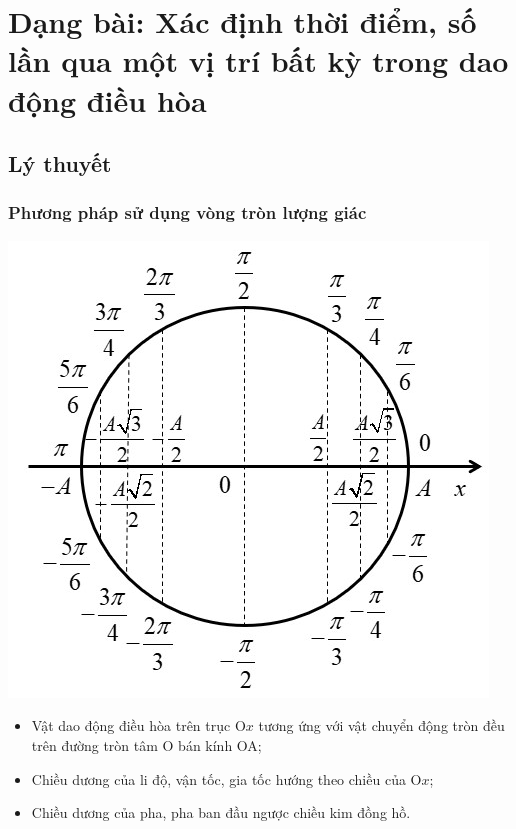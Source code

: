 
\chapter[Dạng bài: Xác định thời điểm, số lần qua một vị trí bất kỳ trong dao động điều hòa]{Dạng bài: Xác định thời điểm, số lần qua một vị trí bất kỳ trong dao động điều hòa}
\section{Lý thuyết}
\subsection{Phương pháp sử dụng vòng tròn lượng giác}
\begin{center}
	\includegraphics[scale=0.7]{../figs/VN12-PH-02-A-001-1-V2-4.jpg}
\end{center}
\begin{itemize}
	\item Vật dao động điều hòa trên trục O$x$ tương ứng với vật chuyển động tròn đều trên đường tròn tâm O bán kính OA;
	\item Chiều dương của li độ, vận tốc, gia tốc hướng theo chiều của O$x$;
	\item Chiều dương của pha, pha ban đầu ngược chiều kim đồng hồ.
\end{itemize}
